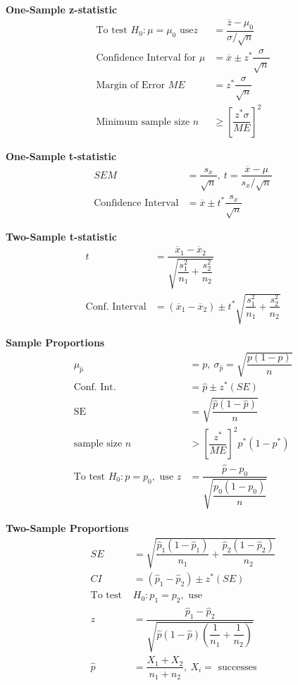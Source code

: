 \documentclass[10pt,letterpaper, landscape]{article}
\begin{document}
\begin{multicols}{3}
\hrulefill

{\large \textbf{One-Sample z-statistic}}
\begin{align}
\text{To test } H_0: \mu=\mu_0\text{ use} 
z &= \dfrac{\overline{z}-\mu_0}{\sigma/\sqrt{n}}\\
\text{Confidence Interval for }\mu &= \overline{x}\pm z^* \dfrac{\sigma}{\sqrt{n}}\\
\text{Margin of Error }ME &=z^* \dfrac{\sigma}{\sqrt{n}}\\
\text{Minimum sample size }n &\geq \left[ \dfrac{z^*\sigma}{ME}\right]^2
\end{align}
\hrulefill

{\large \textbf{One-Sample t-statistic}}
\begin{align}
 SEM &=\dfrac{s_x}{\sqrt{n}}, 
\ t=\dfrac{\overline{x}-\mu}{s_x/\sqrt{n}}\\
\text{Confidence Interval} &= \overline{x}\pm t^*\dfrac{s_x}{\sqrt{n}}
\end{align}
\hrulefill

{\large \textbf{Two-Sample t-statistic}}
\begin{align}
t&=\dfrac{\overline{x}_1 -\overline{x}_2}{
\sqrt{\dfrac{s_1^2}{n_1}+\dfrac{s_2^2}{n_2}}}\\ 
\text{Conf. Interval}&=
(\overline{x}_1-\overline{x}_2)\pm t^*\sqrt{\dfrac{s_1^2}{n_1}+\dfrac{s_2^2}{n_2}}
\end{align}


{\large \textbf{Sample Proportions}}
\begin{align}
\mu_{\hat{p}} &=p, \
\sigma_{\hat{p}} = \sqrt{\dfrac{p(1-p)}{n}}\\
\text{Conf. Int.} &= \hat{p}\pm z^*(SE)\\
\text{SE} &=\sqrt{\dfrac{\hat{p}(1-\hat{p})}{n}}\\
\text{sample size } n &> \left[\dfrac{z^*}{ME}\right]^2 p^*(1-p^*)\\
\text{To test } H_0:p=p_0, \text{ use }  
z &= \dfrac{\hat{p}-p_0}{\sqrt{\dfrac{p_0(1-p_0)}{n}}}
\end{align}
\hrulefill

{\large \textbf{Two-Sample Proportions}}
\begin{align}
SE &= \sqrt{\dfrac{\hat{p}_1(1-\hat{p}_1)}{n_1} + \dfrac{\hat{p}_2(1-\hat{p}_2)}{n_2}}\\
CI &= (\hat{p}_1-\hat{p}_2)\pm z^* (SE)\\
\text{To test }&H_0: p_1=p_2, \text{ use}\\
z&=\dfrac{\hat{p}_1-\hat{p}_2}{\sqrt{\hat{p}(1-\hat{p})\left(\dfrac{1}{n_1}+\dfrac{1}{n_2}\right)}} \\
\hat{p}&=\dfrac{X_1 + X_2}{n_1 + n_2}, \ X_i = \text{ successes}
\end{align}
\hrulefill


\end{multicols}
\end{document}
